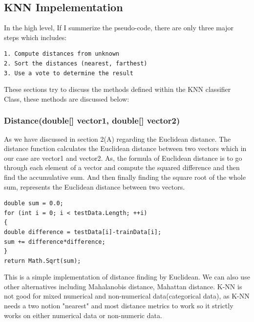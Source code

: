 \documentclass[conference]{IEEEtran}
\begin{document}
\subsection{KNN Impelementation}
In the high level, If I summerize the pseudo-code, there are only three major steps which includes:
\begin{lstlisting}
1. Compute distances from unknown
2. Sort the distances (nearest, farthest)
3. Use a vote to determine the result
\end{lstlisting}

These sections try to discuss the methods defined within the KNN classifier Class, these methods are discussed below:

\subsubsection{Distance(double[] vector1, double[] vector2)}
As we have discussed in section 2(A) regarding the Euclidean distance. The distance function calculates the Euclidean distance between two vectors which in our case are vector1 and vector2. As, the formula of Euclidean distance is to go through each element of a vector and compute the squared difference and then find the accumulative sum. And then finally finding the square root of the whole sum, represents the Euclidean distance between two vectors. 

\begin{lstlisting}
double sum = 0.0;
for (int i = 0; i < testData.Length; ++i)
{
double difference = testData[i]-trainData[i];
sum += difference*difference;
}
return Math.Sqrt(sum);
\end{lstlisting}

This is a simple implementation of distance finding by Euclidean. We can also use other alternatives including Mahalanobis distance, Mahattan distance. K-NN is not good for mixed numerical and non-numerical data(categorical data), as K-NN needs a two notion "nearest" and most distance metrics to work so it strictly works on either numerical data or non-numeric data.  
\end{document}
